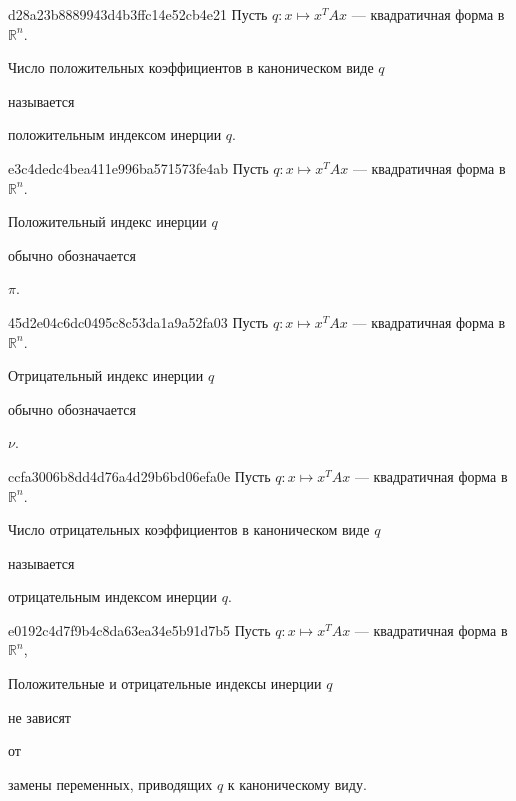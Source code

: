 \begin{note}{d28a23b8889943d4b3ffc14e52cb4e21}
    Пусть \({ q : x \mapsto x^{T}Ax }\) --- квадратичная форма в \({ \mathbb R^{n} }\).
    \begin{icloze}{1}Число положительных коэффициентов в каноническом виде \({ q }\)\end{icloze} называется \begin{icloze}{2}положительным индексом инерции \({ q }\).\end{icloze}
\end{note}

\begin{note}{e3c4dedc4bea411e996ba571573fe4ab}
    Пусть \({ q : x \mapsto x^{T}Ax }\) --- квадратичная форма в \({ \mathbb R^{n} }\).
    \begin{icloze}{2}Положительный индекс инерции \({ q }\)\end{icloze} обычно обозначается \begin{icloze}{1}\({ \pi }\).\end{icloze}
\end{note}

\begin{note}{45d2e04c6dc0495c8c53da1a9a52fa03}
    Пусть \({ q : x \mapsto x^{T}Ax }\) --- квадратичная форма в \({ \mathbb R^{n} }\).
    \begin{icloze}{2}Отрицательный индекс инерции \({ q }\)\end{icloze} обычно обозначается \begin{icloze}{1}\({ \nu }\).\end{icloze}
\end{note}

\begin{note}{ccfa3006b8dd4d76a4d29b6bd06efa0e}
    Пусть \({ q : x \mapsto x^{T}Ax }\) --- квадратичная форма в \({ \mathbb R^{n} }\).
    \begin{icloze}{1}Число отрицательных коэффициентов в каноническом виде \({ q }\)\end{icloze} называется \begin{icloze}{2}отрицательным индексом инерции \({ q }\).\end{icloze}
\end{note}

\begin{note}{e0192c4d7f9b4c8da63ea34e5b91d7b5}
    Пусть \({ q : x \mapsto x^{T}Ax }\) --- квадратичная форма в \({ \mathbb R^{n} }\),\:
    \begin{icloze}{3}Положительные и отрицательные индексы инерции \({ q }\)\end{icloze} \begin{icloze}{2}не зависят\end{icloze} от \begin{icloze}{1}замены переменных, приводящих \({ q }\) к каноническому виду.\end{icloze}
\end{note}

